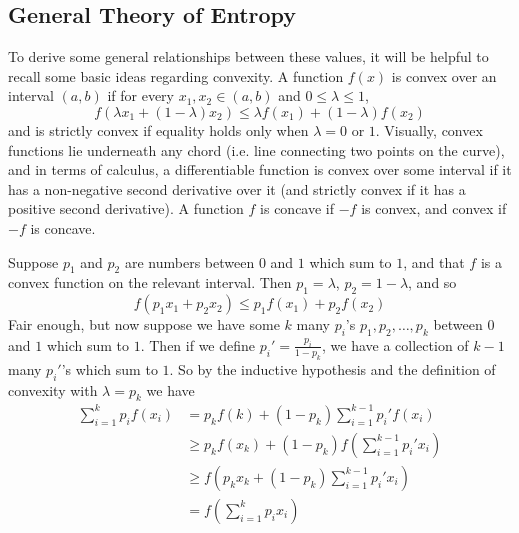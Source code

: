 \subsection{General Theory of Entropy}
To derive some general relationships between these values, it will be helpful to recall some basic ideas regarding convexity. A function $f(x)$ is convex over an interval $(a,b)$ if for every $x_1,x_2 \in (a,b)$ and $0 \leq \lambda \leq 1$, 
\[ f(\lambda x_1 + (1-\lambda)x_2) \leq \lambda f(x_1) + (1-\lambda)f(x_2) \]
and is strictly convex if equality holds only when $\lambda = 0$ or $1$. Visually, convex functions lie underneath any chord (i.e. line connecting two points on the curve), and in terms of calculus, a differentiable function is convex over some interval if it has a non-negative second derivative over it (and strictly convex if it has a positive second derivative). A function $f$ is concave if $-f$ is convex, and convex if $-f$ is concave. \par 
Suppose $p_1$ and $p_2$ are numbers between $0$ and $1$ which sum to $1$, and that $f$ is a convex function on the relevant interval. Then $p_1 = \lambda$, $p_2 = 1-\lambda$, and so 
\[ f(p_1x_1 + p_2x_2) \leq p_1f(x_1)+p_2f(x_2) \] 
Fair enough, but now suppose we have some $k$ many $p_i$'s $p_1,p_2,\ldots,p_k$ between $0$ and $1$ which sum to $1$. Then if we define $p_i' = \frac{p_i}{1-p_k}$, we have a collection of $k-1$ many $p_i'$'s which sum to $1$. So by the inductive hypothesis and the definition of convexity with $\lambda = p_k$ we have
\begin{align*}
	\sum_{i=1}^k p_if(x_i) &= p_kf(k)+(1-p_k)\sum_{i=1}^{k-1}p_i'f(x_i) \\
		&\geq p_kf(x_k)+(1-p_k)f\left( \sum_{i=1}^{k-1} p_i'x_i \right) \\
		&\geq f\left( p_kx_k+(1-p_k)\sum_{i=1}^{k-1}p_i'x_i \right) \\
		&= f\left( \sum_{i=1}^k p_ix_i \right)
\end{align*} 

